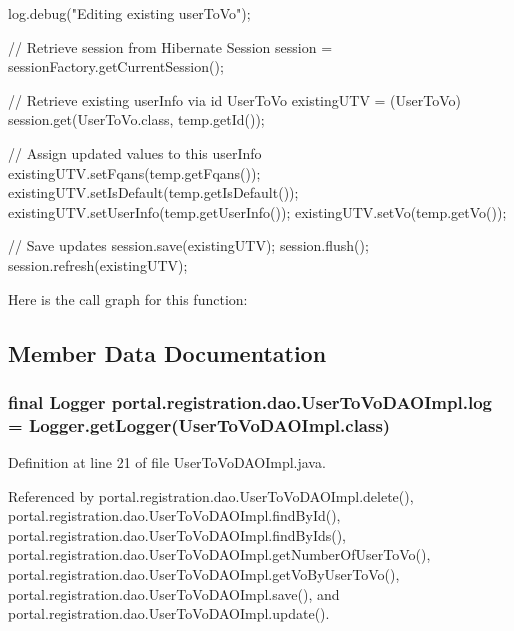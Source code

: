 \begin{DoxyCode}
                                          {
                log.debug("Editing existing userToVo");

                // Retrieve session from Hibernate
                Session session = sessionFactory.getCurrentSession();

                // Retrieve existing userInfo via id
                UserToVo existingUTV = (UserToVo) session.get(UserToVo.class,
                                temp.getId());

                // Assign updated values to this userInfo
                existingUTV.setFqans(temp.getFqans());
                existingUTV.setIsDefault(temp.getIsDefault());
                existingUTV.setUserInfo(temp.getUserInfo());
                existingUTV.setVo(temp.getVo());

                // Save updates
                session.save(existingUTV);
                session.flush();
                session.refresh(existingUTV);
        }
\end{DoxyCode}


Here is the call graph for this function:




\subsection{Member Data Documentation}
\hypertarget{classportal_1_1registration_1_1dao_1_1UserToVoDAOImpl_a8cb65475ce6db7bfea1d0be519bf06a5}{
\subsubsection[{log}]{\setlength{\rightskip}{0pt plus 5cm}final Logger {\bf portal.registration.dao.UserToVoDAOImpl.log} = Logger.getLogger(UserToVoDAOImpl.class)}}
\label{classportal_1_1registration_1_1dao_1_1UserToVoDAOImpl_a8cb65475ce6db7bfea1d0be519bf06a5}


Definition at line 21 of file UserToVoDAOImpl.java.



Referenced by portal.registration.dao.UserToVoDAOImpl.delete(), portal.registration.dao.UserToVoDAOImpl.findById(), portal.registration.dao.UserToVoDAOImpl.findByIds(), portal.registration.dao.UserToVoDAOImpl.getNumberOfUserToVo(), portal.registration.dao.UserToVoDAOImpl.getVoByUserToVo(), portal.registration.dao.UserToVoDAOImpl.save(), and portal.registration.dao.UserToVoDAOImpl.update().

